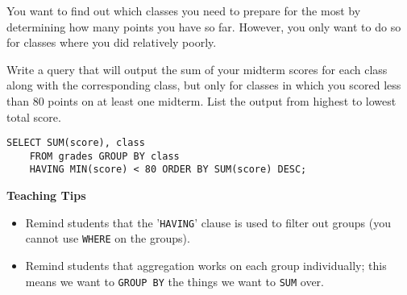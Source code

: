 \begin{blocksection}
\question 
You want to find out which classes you need to prepare for the most by determining how many points you have so far. However, you only want to do so for classes where you did relatively poorly.

Write a query that will output the sum of your midterm scores for each class along with the corresponding class, but only for classes in which you scored less than 80 points on at least one midterm. List the output from highest to lowest total score.

\begin{solution}[1.5in]
\begin{lstlisting}
SELECT SUM(score), class
    FROM grades GROUP BY class
    HAVING MIN(score) < 80 ORDER BY SUM(score) DESC;
\end{lstlisting}
\end{solution}
\end{blocksection}

\begin{guide}
\begin{blocksection}
\textbf{Teaching Tips}
\begin{itemize}
    \item Remind students that the '\lstinline{HAVING}' clause is used to filter out groups (you cannot use \lstinline{WHERE} on the groups).
    \item Remind students that aggregation works on each group individually; this means we want to \lstinline{GROUP BY} the things we want to \lstinline{SUM} over.
\end{itemize}
\end{blocksection}
\end{guide}